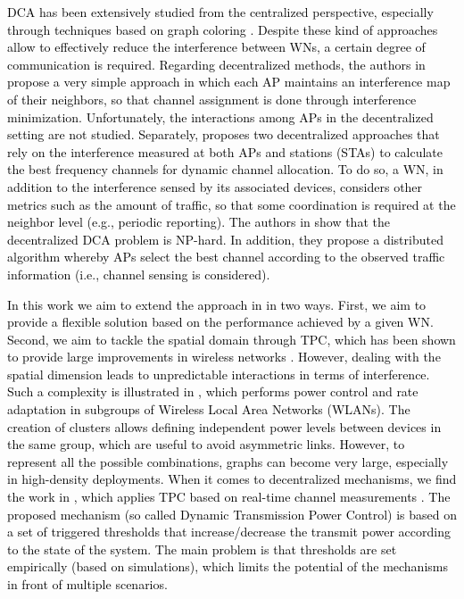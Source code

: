 \documentclass{article}
\begin{document}
	\textcolor{black}{DCA has been extensively studied from the centralized perspective, especially through techniques based on graph coloring \cite{riihijarvi2005frequency, mishra2005weighted}. Despite these kind of approaches allow to effectively reduce the interference between WNs, a certain degree of communication is required. Regarding decentralized methods, the authors in \cite{akl2007dynamic} propose a very simple approach in which each AP maintains an interference map of their neighbors, so that channel assignment is done through interference minimization. Unfortunately, the interactions among APs in the decentralized setting are not studied. Separately, \cite{chen2007improved} proposes two decentralized approaches that rely on the interference measured at both APs and stations (STAs) to calculate the best frequency channels for dynamic channel allocation. To do so, a WN, in addition to the interference sensed by its associated devices, considers other metrics such as the amount of traffic, so that some coordination is required at the neighbor level (e.g., periodic reporting). The authors in \cite{yue2011cacao} show that the decentralized DCA problem is NP-hard. In addition, they propose a distributed algorithm whereby APs select the best channel according to the observed traffic information (i.e., channel sensing is considered).}
	
	\textcolor{black}{In this work we aim to extend the approach in \cite{yue2011cacao} in two ways. \textcolor{black}{First, we aim to provide a flexible solution based on the performance achieved by a given WN.} Second, we aim to tackle the spatial domain through TPC\textcolor{black}{, which has been shown to provide large improvements in wireless networks \cite{elbatt2000power}}. \textcolor{black}{However}, dealing with the spatial dimension leads to unpredictable interactions in terms of interference. \textcolor{black}{Such a complexity is illustrated} in \cite{tang2014joint}, which performs power control and rate adaptation in subgroups of Wireless Local Area Networks (WLANs). The creation of clusters allows defining independent power levels between devices in the same group, which are useful to avoid asymmetric links. However, to represent all the possible combinations, graphs can become very large, especially in high-density deployments. \textcolor{black}{When it comes to decentralized mechanisms, we find the work in \cite{gandarillas2014dynamic}, which applies TPC based on real-time channel measurements \cite{gandarillas2014dynamic}}. The proposed mechanism (so called Dynamic Transmission Power Control) is based on a set of triggered thresholds that increase/decrease the transmit power according to the state of the system. The main problem is that thresholds are set empirically (based on simulations), which limits the potential of the mechanisms in front of multiple scenarios.}
	
\end{document}
